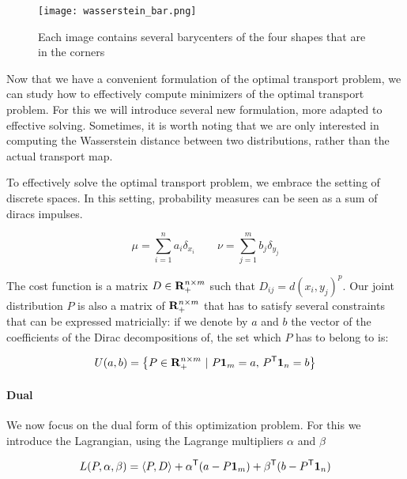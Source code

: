 \begin{figure}[h]
	\centering \texttt{[image: wasserstein\_bar.png]}
	\captionsetup{justification=centering} \caption{Each image contains
	several barycenters of the four shapes that are in the corners}
	\label{shp1}
\end{figure}


Now that we have a convenient formulation of the optimal transport problem,
we can study how to effectively compute minimizers of the optimal transport
problem. For this we will introduce several new formulation, more adapted
to effective solving. Sometimes, it is worth noting that we are only interested
in computing the Wasserstein distance between two distributions, rather than
the actual transport map.


To effectively solve the optimal transport problem, we embrace the setting
of discrete spaces. In this setting, probability measures can be seen as a
sum of diracs impulses.

$$ \mu = \sum_{i=1}^n a_i \delta_{x_i} \qquad \nu = \sum_{j =1}^m b_j \delta_{y_j} $$

The cost function is a matrix $D \in \mathbf{R}_+^{n \times m}$ such that $D_{ij}
= d(x_i, y_j)^p$. Our joint distribution $P$ is also a matrix of $\mathbf{R}_+^{n
\times m}$ that has to satisfy several constraints that can be expressed
matricially: if we denote by $a$ and $b$ the vector of the coefficients of
the Dirac decompositions of, the set which $P$ has to belong to is:

$$ U(a, b) = \left\{ P \in \mathbf{R}_+^{n \times m}~|~P \mathbf{1}_m = a, \, P^{\mathsf{T}} \mathbf{1}_n = b \right\} $$


\paragraph{Dual} We now focus on the dual form of this optimization
problem. For this we introduce the Lagrangian, using the Lagrange multipliers
$\alpha$ and $\beta$

$$
    L(P, \alpha, \beta) = \langle P, D \rangle + \alpha^{\mathsf{T}} (a - P \mathbf{1}_m) + \beta^{\mathsf{T}} (b - P^{\mathsf{T}} \mathbf{1}_n)
$$

